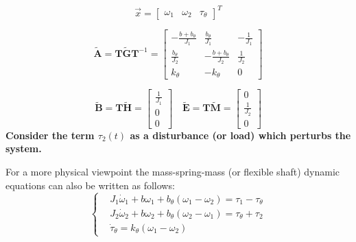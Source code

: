 \documentclass[12pt,a4paper,oneside]{book}
\begin{document}
\begin{onehalfspace}
\begin{mybox}
	\begin{equation*}
		\vec{x} = \left[\begin{matrix} \omega_1&\omega_2&\tau_{\theta} 
		\end{matrix} \right]^T
	\end{equation*}
	
	\begin{equation*}
		\tilde{\mathbf{A}} = \mathbf{T}\tilde{\mathbf{G}}\mathbf{T}^{-1} =
		\left[ \begin{matrix}
			-\frac{b+b_{\theta}}{J_1} & \frac{b_{\theta}}{J_1} & 
			-\frac{1}{J_1}\\[6pt]
			\frac{b_{\theta}}{J_2} & -\frac{b+b_{\theta}}{J_2} & 
			\frac{1}{J_2}\\[6pt]
			k_{\theta} & -k_{\theta} & 0
		\end{matrix}\right]
	\end{equation*}
	
	\begin{equation*}
		\tilde{\mathbf{B}} = \mathbf{T}\tilde{\mathbf{H}} =
		\left[ \begin{matrix}
			\frac{1}{J_1} \\[6pt]
			0 \\[6pt]
			0
		\end{matrix}\right]
		\quad
		\tilde{\mathbf{E}} = \mathbf{T}\tilde{\mathbf{M}} =
		\left[ \begin{matrix}
			0 \\[6pt]
			\frac{1}{J_2} \\[6pt]
			0
		\end{matrix}\right]
	\end{equation*}
	\textbf{Consider the term $\tau_2(t)$ as a disturbance (or load) which perturbs 
		the system.}
	
	\vspace{5mm}
	For a more physical viewpoint the mass-spring-mass (or flexible shaft) dynamic 
	equations can also be written as follows:
	\begin{equation}
		\left\lbrace 
		\begin{aligned}
			& J_1 \dot{\omega}_1 + b\omega_1+b_{\theta}(\omega_1-\omega_2) = \tau_1 
			- \tau_{\theta} \\[6pt]
			& J_2 \dot{\omega}_2 + b\omega_2+b_{\theta}(\omega_2-\omega_1) = 
			\tau_{\theta} + \tau_2 \\[6pt]
			& \dot{\tau}_{\theta} = k_{\theta}\left( \omega_1-\omega_2\right) 
		\end{aligned}
		\right. 
	\end{equation}
\end{mybox}




\end{onehalfspace}
\end{document}
